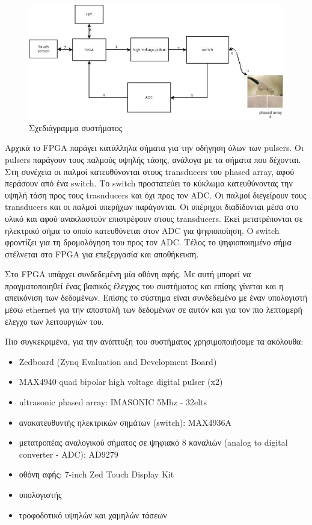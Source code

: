 \documentclass[12pt,a4paper]{book}
\begin{document}
\begin{figure}
	\centering
	\includegraphics[width=\textwidth]{system_schem}
	\caption{Σχεδιάγραμμα συστήματος}
	\label{syst_schem}
\end{figure}

Αρχικά το FPGA παράγει κατάλληλα σήματα για την οδήγηση όλων των pulsers. Οι pulsers παράγουν τους παλμούς υψηλής τάσης, ανάλογα με τα σήματα που δέχονται. Στη συνέχεια οι παλμοί κατευθύνονται στους transducers του phased array, αφού περάσουν από ένα switch. Το switch προστατεύει το κύκλωμα κατευθύνοντας την υψηλή τάση προς τους trasnducers και όχι προς τον ADC. Οι παλμοί διεγείρουν τους transducers και οι παλμοί υπερήχων παράγονται. Οι υπέρηχοι διαδίδονται μέσα στο υλικό και αφού ανακλαστούν επιστρέφουν στους transducers. Εκεί μετατρέπονται σε ηλεκτρικό σήμα το οποίο κατευθύνεται στον ADC για ψηφιοποίηση. Ο switch φροντίζει για τη δρομολόγηση του προς τον ADC. Τέλος το ψηφιοποιημένο σήμα στέλνεται στο FPGA για επεξεργασία και αποθήκευση. 

Στο FPGA υπάρχει συνδεδεμένη μία οθόνη αφής. Με αυτή μπορεί να πραγματοποιηθεί ένας βασικός έλεγχος του συστήματος και επίσης γίνεται και η απεικόνιση των δεδομένων. Επίσης το σύστημα είναι συνδεδεμένο με έναν υπολογιστή μέσω ethernet για την αποστολή των δεδομένων σε αυτόν και για τον πιο λεπτομερή έλεγχο των λειτουργιών του.

Πιο συγκεκριμένα, για την ανάπτυξη του συστήματος χρησιμοποιήσαμε τα ακόλουθα:
\begin{itemize}
	\item Zedboard (Zynq Evaluation and Development Board)
	\item MAX4940 quad bipolar high voltage digital pulser (x2)
	\item ultrasonic phased array: IMASONIC 5Mhz - 32elts
	\item ανακατευθυντής ηλεκτρικών σημάτων (switch): MAX4936A
	\item μετατροπέας αναλογικού σήματος σε ψηφιακό 8 καναλιών (analog to digital converter - ADC): AD9279
	\item οθόνη αφής: 7-inch Zed Touch Display Kit
	\item υπολογιστής
	\item τροφοδοτικό υψηλών και χαμηλών τάσεων
\end{itemize}
\end{document}
